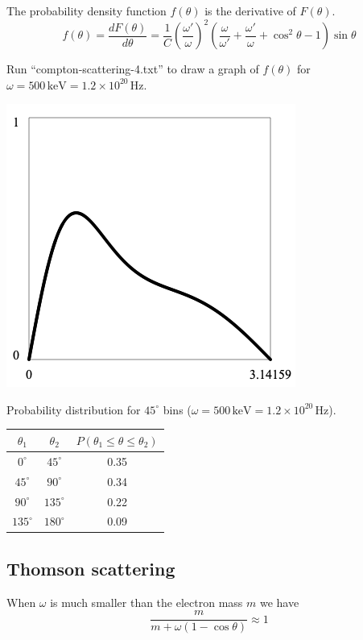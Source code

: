 \documentclass[12pt]{article}
\begin{document}
\noindent
The probability density function $f(\theta)$ is the derivative of $F(\theta)$.
\begin{equation*}
f(\theta)=\frac{dF(\theta)}{d\theta}
=\frac{1}{C}
\left(\frac{\omega'}{\omega}\right)^2
\left(\frac{\omega}{\omega'}+\frac{\omega'}{\omega}+\cos^2\theta-1\right)
\sin\theta
\end{equation*}

\noindent
Run ``compton-scattering-4.txt'' to draw a graph of $f(\theta)$ for
$\omega=500\,\text{keV}=1.2\times10^{20}\,\text{Hz}$.

\begin{center}
\includegraphics[scale=0.5]{compton-scattering.png}
\end{center}

\noindent
Probability distribution for $45^\circ$ bins
($\omega=500\,\text{keV}=1.2\times10^{20}\,\text{Hz}$).

\begin{center}
\begin{tabular}{|c|c|c|}
\hline
$\theta_1$ & $\theta_2$ & $P(\theta_1\le\theta\le\theta_2)$\\
\hline
$0^\circ$ & $45^\circ$ & 0.35 \\
$45^\circ$ & $90^\circ$ & 0.34 \\
$90^\circ$ & $135^\circ$ & 0.22 \\
$135^\circ$ & $180^\circ$ & 0.09 \\
\hline
\end{tabular}
\end{center}

\subsection*{Thomson scattering}
When $\omega$ is much smaller than the electron mass $m$ we have
\begin{equation*}
\frac{m}{m+\omega(1-\cos\theta)}\approx1
\end{equation*}
\end{document}
